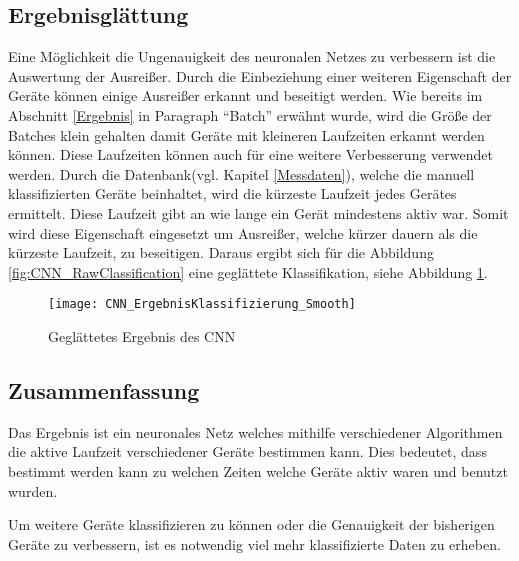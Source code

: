    \subsection{Ergebnisglättung}
        Eine Möglichkeit die Ungenauigkeit des neuronalen Netzes zu verbessern ist die Auswertung der Ausreißer.
        Durch die Einbeziehung einer weiteren Eigenschaft der Geräte können einige Ausreißer erkannt und beseitigt werden.
        Wie bereits im Abschnitt \ref{Ergebnis} in Paragraph "`Batch"' erwähnt wurde, wird die Größe der Batches klein gehalten damit Geräte mit kleineren Laufzeiten erkannt werden können.
        Diese Laufzeiten können auch für eine weitere Verbesserung verwendet werden.
        Durch die Datenbank(vgl. Kapitel \ref{Messdaten}), welche die manuell klassifizierten Geräte beinhaltet, wird die kürzeste Laufzeit jedes Gerätes ermittelt.
        Diese Laufzeit gibt an wie lange ein Gerät mindestens aktiv war.
        Somit wird diese Eigenschaft eingesetzt um Ausreißer, welche kürzer dauern als die kürzeste Laufzeit, zu beseitigen.
        Daraus ergibt sich für die Abbildung \ref{fig:CNN_RawClassification} eine geglättete Klassifikation, siehe Abbildung \ref{fig:CNN_SmoothClassification}.

        \begin{figure}[H]
            \centering
            \texttt{[image: CNN\_ErgebnisKlassifizierung\_Smooth]}
            \caption{Geglättetes Ergebnis des CNN}
            \label{fig:CNN_SmoothClassification}
        \end{figure}
    
    \subsection{Zusammenfassung}
        Das Ergebnis ist ein neuronales Netz welches mithilfe verschiedener Algorithmen die aktive Laufzeit verschiedener Geräte bestimmen kann.
        Dies bedeutet, dass bestimmt werden kann zu welchen Zeiten welche Geräte aktiv waren und benutzt wurden.
        
        Um weitere Geräte klassifizieren zu können oder die Genauigkeit der bisherigen Geräte zu verbessern, ist es notwendig viel mehr klassifizierte Daten zu erheben.